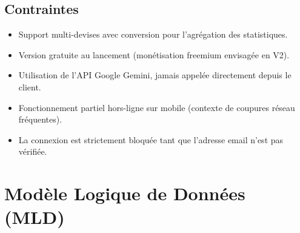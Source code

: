 \documentclass[11pt,a4paper]{article}
\begin{document}
\subsection{Contraintes}
\begin{itemize}[leftmargin=*]
    \item Support multi-devises avec conversion pour l'agrégation des statistiques.
    \item Version gratuite au lancement (monétisation freemium envisagée en V2).
    \item Utilisation de l'API Google Gemini, jamais appelée directement depuis le client.
    \item Fonctionnement partiel hors-ligne sur mobile (contexte de coupures réseau fréquentes).
    \item La connexion est strictement bloquée tant que l'adresse email n'est pas vérifiée.
\end{itemize}

\section{Modèle Logique de Données (MLD)}
\end{document}
